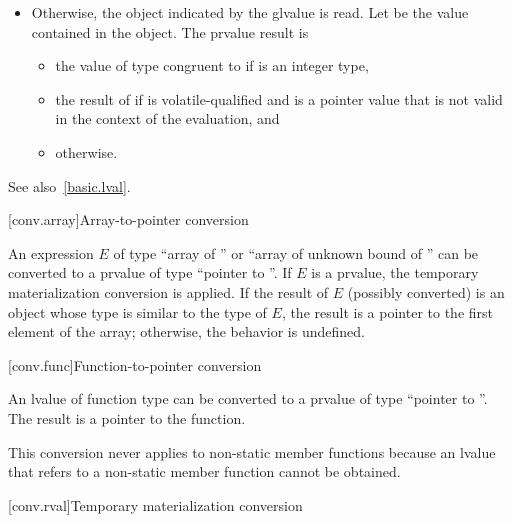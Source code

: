 \begin{itemize}
\item Otherwise, the object indicated by the glvalue is read.
Let  be the value contained in the object.
The prvalue result is
\begin{itemize}
\item
the value of type  congruent to 
if  is an integer type,
\item
the result of 
if  is volatile-qualified
and  is a pointer value
that is not valid in the context of the evaluation, and
\item
{} otherwise.
\end{itemize}
\end{itemize}

\pnum
\begin{note}
See also~\ref{basic.lval}.
\end{note}

[conv.array]{Array-to-pointer conversion}

\pnum
{}%
%
%
An expression $E$ of type ``array of  '' or ``array
of unknown bound of '' can be converted to a prvalue of type
``pointer to ''.
If $E$ is a prvalue,
the temporary materialization conversion is applied.
If the result of $E$ (possibly converted) is an object
whose type is similar to the type of $E$,
the result is a pointer to the first element of the array;
otherwise, the behavior is undefined.

[conv.func]{Function-to-pointer conversion}

\pnum
{}%
An lvalue of function type  can be converted to a prvalue of
type ``pointer to ''. The result is a pointer to the
function.
\begin{footnote}
This conversion never applies to non-static member functions because an
lvalue that refers to a non-static member function cannot be obtained.
\end{footnote}

[conv.rval]{Temporary materialization conversion}
%

